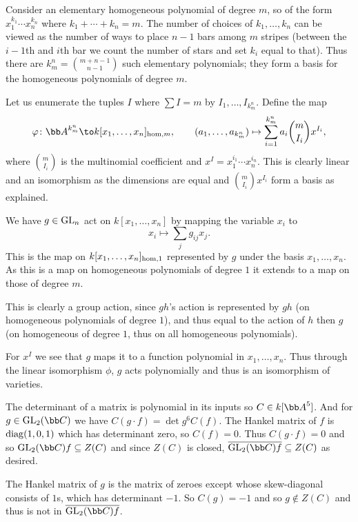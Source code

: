 \eprob

\benum
    \item Consider an elementary homogeneous polynomial of degree $m$, so of the form $x_1^{k_1}\cdots x_n^{k_n}$ where $k_1+\cdots+k_n=m$.
    The number of choices of $k_1,\dots,k_n$ can be viewed as the number of ways to place $n-1$ bars among $m$ stripes (between the $i-1$th and
    $i$th bar we count the number of stars and set $k_i$ equal to that).
    Thus there are $k^n_m=\binom{m+n-1}{n-1}$ such elementary polynomials; they form a basis for the homogeneous polynomials of degree $m$.

    Let us enumerate the tuples $I$ where $\sum I=m$ by $I_1,\dots,I_{k^n_m}$.
    Define the map
    $$ \phi\colon\bA^{k^n_m} \to k[x_1,\dots,x_n]_{\homo,m},\qquad (a_1,\dots,a_{k^n_m}) \mapsto \sum_{i=1}^{k^n_m}a_i\binom m{I_i}x^{I_i} , $$
    where $\binom m{I_i}$ is the multinomial coefficient and $x^I=x_1^{i_1}\cdots x_n^{i_n}$.
    This is clearly linear and an isomorphism as the dimensions are equal and $\binom m{I_i}x^{I_i}$ form a basis as explained.

    \item We have $g\in{\rm GL}_n$ act on $k[x_1,\dots,x_n]$ by mapping the variable $x_i$ to
    $$ x_i \mapsto \sum_j g_{ij}x_j . $$
    This is the map on $k[x_1,\dots,x_n]_{{\rm hom},1}$ represented by $g$ under the basis $x_1,\dots,x_n$.
    As this is a map on homogeneous polynomials of degree $1$ it extends to a map on those of degree $m$.

    This is clearly a group action, since $gh$'s action is represented by $gh$ (on homogeneous polynomials of degree $1$), and thus equal to
    the action of $h$ then $g$ (on homogeneous of degree $1$, thus on all homogeneous polynomials).

    For $x^I$ we see that $g$ maps it to a function polynomial in $x_1,\dots,x_n$.
    Thus through the linear isomorphism $\phi$, $g$ acts polynomially and thus is an isomorphism of varieties.

    \item The determinant of a matrix is polynomial in its inputs so $C\in k[\bA^5]$.
    And for $g\in\gl_2(\bC)$ we have $C(g\cdot f)=\det g^6C(f)$.
    The Hankel matrix of $f$ is ${\rm diag}(1,0,1)$ which has determinant zero, so $C(f)=0$.
    Thus $C(g\cdot f)=0$ and so $\gl_2(\bC)f\subseteq Z(C)$ and since $Z(C)$ is closed, $\cl{\gl_2(\bC)f}\subseteq Z(C)$ as desired.

    \item The Hankel matrix of $g$ is the matrix of zeroes except whose skew-diagonal consists of $1$s, which has determinant $-1$.
    So $C(g)=-1$ and so $g\notin Z(C)$ and thus is not in $\cl{\gl_2(\bC)f}$.
\eenum

\bye

